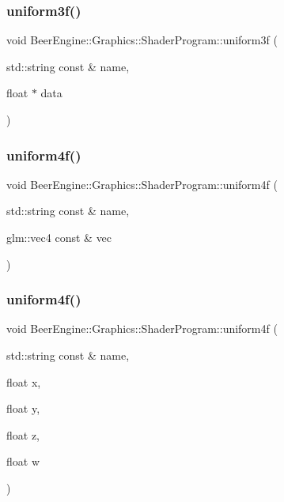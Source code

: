 \subsubsection{\texorpdfstring{uniform3f()}{uniform3f()}\hspace{0.1cm}{\footnotesize\ttfamily [4/4]}}
{\footnotesize\ttfamily void Beer\+Engine\+::\+Graphics\+::\+Shader\+Program\+::uniform3f (\begin{DoxyParamCaption}\item[{std\+::string const \&}]{name,  }\item[{float $\ast$}]{data }\end{DoxyParamCaption})}

\mbox{\label{class_beer_engine_1_1_graphics_1_1_shader_program_ac2819747448fdaff830aea62913b932b}} 
\subsubsection{\texorpdfstring{uniform4f()}{uniform4f()}\hspace{0.1cm}{\footnotesize\ttfamily [1/4]}}
{\footnotesize\ttfamily void Beer\+Engine\+::\+Graphics\+::\+Shader\+Program\+::uniform4f (\begin{DoxyParamCaption}\item[{std\+::string const \&}]{name,  }\item[{glm\+::vec4 const \&}]{vec }\end{DoxyParamCaption})}

\mbox{\label{class_beer_engine_1_1_graphics_1_1_shader_program_a38c33da991e2c955c2f6a415d747b432}} 
\subsubsection{\texorpdfstring{uniform4f()}{uniform4f()}\hspace{0.1cm}{\footnotesize\ttfamily [2/4]}}
{\footnotesize\ttfamily void Beer\+Engine\+::\+Graphics\+::\+Shader\+Program\+::uniform4f (\begin{DoxyParamCaption}\item[{std\+::string const \&}]{name,  }\item[{float}]{x,  }\item[{float}]{y,  }\item[{float}]{z,  }\item[{float}]{w }\end{DoxyParamCaption})}

